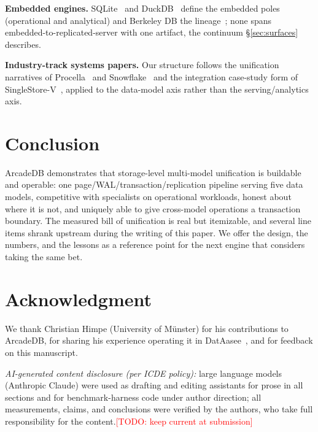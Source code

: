 \documentclass[conference]{IEEEtran}
\newcommand{\todo}[1]{\textcolor{red}{[TODO: #1]}}
\newcommand{\arcadedb}{ArcadeDB}
\begin{document}
\textbf{Embedded engines.} SQLite~\cite{gaffney2022sqlite} and
DuckDB~\cite{duckdb,raasveldt-duckdb-cidr} define the embedded poles
(operational and analytical) and Berkeley DB the
lineage~\cite{olson1999berkeleydb}; none spans embedded-to-replicated-server
with one artifact, the continuum \S\ref{sec:surfaces} describes.

\textbf{Industry-track systems papers.} Our structure follows the
unification narratives of Procella~\cite{chattopadhyay2019procella} and
Snowflake~\cite{dageville2016snowflake} and the integration case-study form
of SingleStore-V~\cite{chen2024singlestorev}, applied to the data-model axis
rather than the serving/analytics axis.

\section{Conclusion}\label{sec:conclusion}
\arcadedb{} demonstrates that storage-level multi-model unification is
buildable and operable: one page/WAL/transaction/replication pipeline serving
five data models, competitive with specialists on operational workloads,
honest about where it is not, and uniquely able to give cross-model
operations a transaction boundary. The measured bill of unification is real
but itemizable, and several line items shrank upstream during the writing of
this paper. We offer the design, the numbers, and the lessons as a reference
point for the next engine that considers taking the same bet.

\section*{Acknowledgment}
We thank Christian Himpe (University of M\"unster) for his contributions to
ArcadeDB, for sharing his experience operating it in
DatAasee~\cite{himpe2024dataasee}, and for feedback on this manuscript.

\emph{AI-generated content disclosure (per ICDE policy):} large language
models (Anthropic Claude) were used as drafting and editing assistants for
prose in all sections and for benchmark-harness code under author direction;
all measurements, claims, and conclusions were verified by the authors, who
take full responsibility for the content.\todo{keep current at submission}



\end{document}
